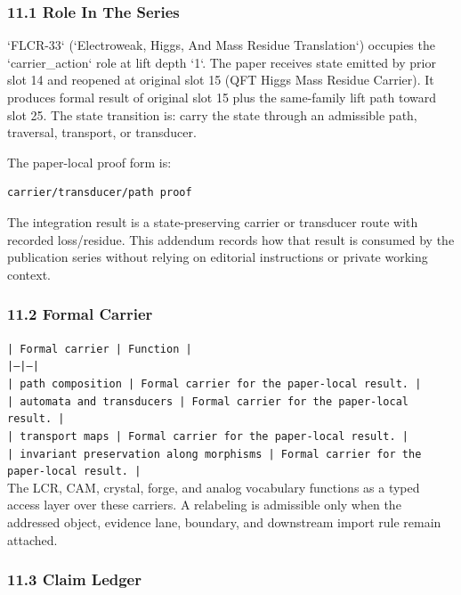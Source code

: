 \documentclass[11pt]{article}
\begin{document}
\subsubsection*{11.1 Role In The Series}

`FLCR-33` (`Electroweak, Higgs, And Mass Residue Translation`) occupies the `carrier\_action` role at lift depth `1`.
The paper receives state emitted by prior slot 14 and reopened at original slot 15 (QFT Higgs Mass Residue Carrier). It produces formal result of original slot 15 plus the same-family lift path toward slot 25. The state transition is:
carry the state through an admissible path, traversal, transport, or transducer.

The paper-local proof form is:

\begin{verbatim}
carrier/transducer/path proof
\end{verbatim}

The integration result is a state-preserving carrier or transducer route with recorded loss/residue. This addendum records how that result is
consumed by the publication series without relying on editorial instructions or
private working context.

\subsubsection*{11.2 Formal Carrier}

\noindent\texttt{| Formal carrier | Function |}\\
\noindent\texttt{|---|---|}\\
\noindent\texttt{| path composition | Formal carrier for the paper-local result. |}\\
\noindent\texttt{| automata and transducers | Formal carrier for the paper-local result. |}\\
\noindent\texttt{| transport maps | Formal carrier for the paper-local result. |}\\
\noindent\texttt{| invariant preservation along morphisms | Formal carrier for the paper-local result. |}\\

The LCR, CAM, crystal, forge, and analog vocabulary functions as a typed access
layer over these carriers. A relabeling is admissible only when the addressed
object, evidence lane, boundary, and downstream import rule remain attached.

\subsubsection*{11.3 Claim Ledger}
\end{document}
